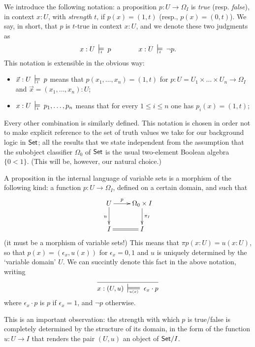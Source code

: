 We introduce the following notation: a proposition $p : U \to \Omega_I$ is \emph{true} (resp. \emph{false}), in context $x :U$, with \emph{strength} $t$, if $p(x) =(1,t)$ (resp., $p(x)=(0,t)$). We say, in short, that $p$ is $t$-true in context $x:U$, and we denote these two judgments as 
\[x:U\entails{t} p \qquad\qquad x:U\entails{t} \lnot p.\]
This notation is extensible in the obvious way: 
\begin{itemize}
  \item $\vec x : U \entails{t} p$ means that $p(x_1,\dots,x_n) = (1,t)$ for $p : U= U_1\times\dots\times U_n\to \Omega_I$ and $\vec x = (x_1,\dots,x_n) : U$;
  \item $x : U \entails{t} p_1,\dots, p_n$ means that for every $1\le i \le n$ one has $p_i(x)=(1,t)$;
\end{itemize}
Every other combination is similarly defined. This notation is chosen in order not to make explicit reference to the set of truth values we take for our background logic in $\mathsf{Set}$; all the results that we state independent from the assumption that the subobject classifier $\Omega_0$ of $\mathsf{Set}$ is the usual two-element Boolean algebra $\{0 < 1\}$. (This will be, however, our natural choice.)
\begin{remark}\label{very_importanta_force}
  A proposition in the internal language of variable sets is a morphism of the following kind: a function $p : U \to \Omega_I$, defined on a certain domain, and such that
  \[
    \xymatrix{
      U\ar[d]_u\ar[r]^-p  & \Omega_0\times I \ar[d]^{\pi_I}\\
      I \ar@{=}[r]& I
    }
  \]
  (it must be a morphism of variable sets!) This means that $\pi p(x : U) = u(x : U)$, so that $p(x) = (\epsilon_x, u(x))$ for $\epsilon_x =0,1$ and $u$ is uniquely determined by the `variable domain' $U$. We can succintly denote this fact in the above notation, writing
  \[\infer{x : (U,u) \entails{u(x)} \epsilon_x\cdot p}{}\]
  where $\epsilon_x \cdot p$ is $p$ if $\epsilon_x=1$, and $\lnot p$ otherwise.

  This is an important observation: the strength with which $p$ is true/false is completely determined by the structure of its domain, in the form of the function $u : U \to I$ that renders the pair $(U,u)$ an object of $\mathsf{Set}/I$.
\end{remark}
